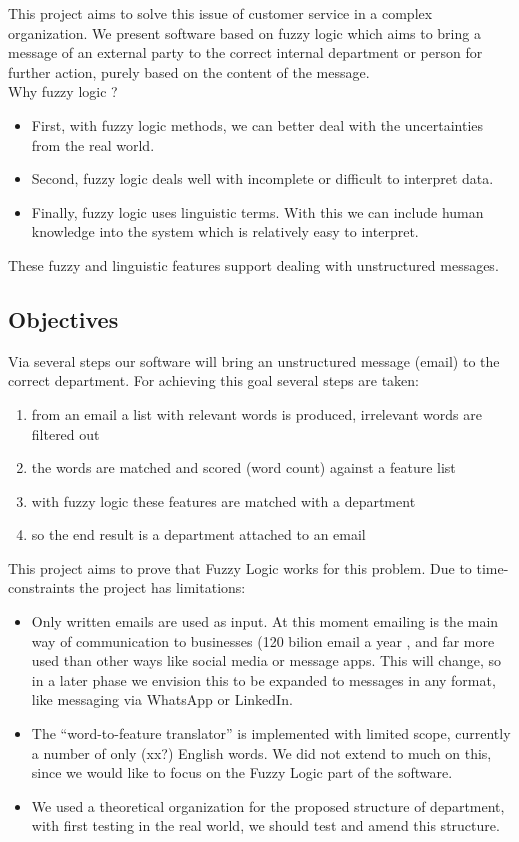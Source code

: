 \documentclass[journal]{IEEEtran}
\begin{document}
This project aims to solve this issue of customer service in a complex organization. We present software based on fuzzy logic which aims to bring a message of an external party to the correct internal department or person for further action, purely based on the content of the message. \\

Why fuzzy logic ?
\begin{itemize}
    \item First, with fuzzy logic methods, we can better deal with the uncertainties from the real world.
    \item Second, fuzzy logic deals well with incomplete or difficult to interpret data.
    \item Finally, fuzzy logic uses linguistic terms. With this we can include human knowledge into the system which is relatively easy to interpret.
\end{itemize}
These fuzzy and linguistic features support dealing with unstructured messages.

\subsection{Objectives}

Via several steps our software will bring an unstructured message (email) to the correct department. For achieving this goal several steps are taken:
\begin{enumerate}
    \item from an email a list with relevant words is produced, irrelevant words are filtered out
    \item the words are matched and scored (word count) against a feature list
    \item with fuzzy logic these features are matched with a department
    \item so the end result is a department attached to an email
\end{enumerate}

This project aims to prove that Fuzzy Logic works for this problem. Due to time-constraints the project has limitations:
\begin{itemize}
    \item Only written emails are used as input. At this moment emailing is the main way of communication to businesses (120 bilion email a year \cite{email_statistics}, and far more used than other ways like social media or message apps. This will change, so in a later phase we envision this to be expanded to messages in any format, like messaging via WhatsApp or LinkedIn.
    \item The ``word-to-feature translator'' is implemented with limited scope, currently a number of only (xx?) English words. We did not extend to much on this, since we would like to focus on the Fuzzy Logic part of the software.
    \item We used a theoretical organization for the proposed structure of department, with first testing in the real world, we should test and amend this structure. %
\end{itemize}
\end{document}
